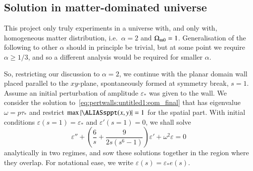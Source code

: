 \subsection{Solution in matter-dominated universe}
    This project only truly experiments in a universe with, and only with, homogeneous matter distribution, i.e.~$\alpha=2$ and $\Omega_\mathrm{m0}=1$. Generalisation of the following to other $\alpha$ should in principle be trivial, but at some point we require $\alpha\geq 1/3$, and so a different analysis would be required for smaller $\alpha$.

    So, restricting our discussion to $\alpha=2$, we continue with the planar domain wall placed parallel to the $xy$-plane, spontaneously formed at symmetry break, $s=1$. Assume an initial perturbation of amplitude $\varepsilon_\ast$ was given to the wall. We consider the solution to~\cref{eq:pertwalls:untitled1:eom_final} that has eigenvalue $\omega=p\tau_\ast$ and restrict $\max{\abs{\sppt(x,y)}}=1$ for the spatial part.
    With initial conditions $\varepsilon(s=1)=\varepsilon_\ast$ and $\varepsilon'(s=1)=0$, we shall solve
    \begin{equation}\label{eq:pertwalls:untitled1:eom_eps_s_MD}
        \varepsilon'' + \left( \frac{6}{s}  +\frac{9}{2s\left(s^6-1\right)} \right) \varepsilon' + \omega^2 \varepsilon = 0
    \end{equation}
    analytically in two regimes, and sow these solutions together in the region where they overlap. For notational ease, we write $\varepsilon(s) = \varepsilon_\ast e(s)$.
    

